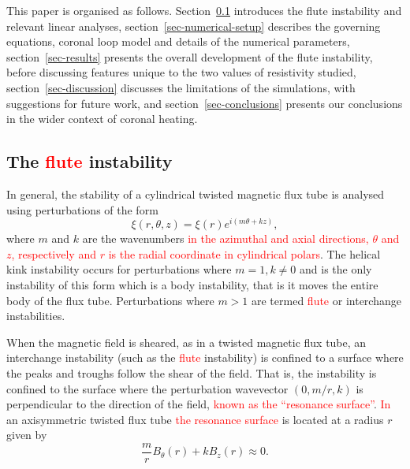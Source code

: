 \documentclass[12pt]{article}
\newcommand{\rs}[2]{\textcolor{red}{#2}}
\begin{document}
This paper is organised as follows. Section~\ref{sec-flute-intro} introduces the flute instability and relevant linear analyses, section~\ref{sec-numerical-setup} describes the governing equations, coronal loop model and details of the numerical parameters, section~\ref{sec-results} presents the overall development of the flute instability, before discussing features unique to the two values of resistivity studied, section~\ref{sec-discussion} discusses the limitations of the simulations, with suggestions for future work, and section~\ref{sec-conclusions} presents our conclusions in the wider context of coronal heating.

\subsection{The \rs{fluting}{flute} instability}
\label{sec-flute-intro}

In general, the stability of a cylindrical twisted magnetic flux tube is analysed using perturbations of the form
\begin{equation}
  \label{eq:kink_perturbation}
\xi(r, \theta, z) = \xi(r) e^{i(m\theta + kz)},
\end{equation}
where $m$ and $k$ are the wavenumbers \rs{in the $\theta$ and $z$
  directions, respectively}{in the azimuthal and axial directions,
  $\theta$ and $z$, respectively and $r$ is the radial coordinate in
  cylindrical polars}. 
The helical kink instability occurs for perturbations where $m=1, k\ne0$ and is the only instability of this form which is a body instability, that is it moves the entire body of the flux tube. Perturbations where $m>1$ are termed \rs{fluting}{flute} or interchange instabilities.

When the magnetic field is sheared, as in a twisted magnetic flux
tube, an interchange instability (such as the \rs{fluting}{flute}
instability) is confined to a surface where the peaks and troughs
follow the shear of the field. That is, the instability is confined to
the surface where the perturbation wavevector $(0, m/r, k)$ is
perpendicular to the direction of the field, \rs{}{known as the
  ``resonance surface''}. \rs{which in}{In} an axisymmetric twisted
flux tube \rs{}{the resonance surface} is located at a radius $r$
given by
\begin{equation}
  \label{eq:resonant_surface}
\frac{m}{r} B_{\theta}(r) + kB_z(r) \approx 0.
\end{equation}
\end{document}
